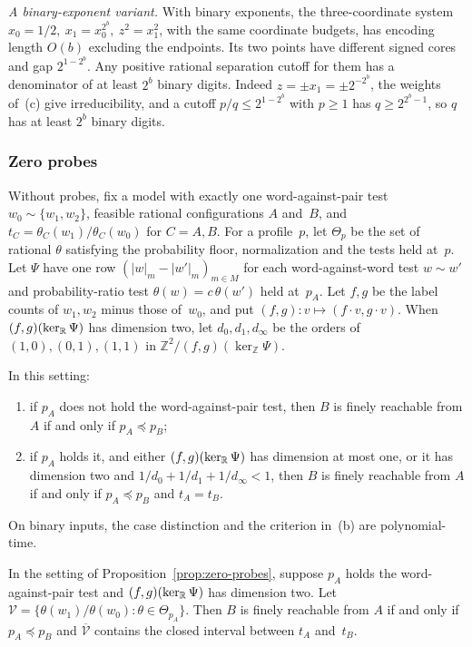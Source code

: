 \emph{A binary-exponent variant.}
With binary exponents, the three-coordinate system $x_0=1/2,\
x_1=x_0^{2^b},\ z^2=x_1^2$, with the same coordinate budgets, has encoding
length $O(b)$ excluding the endpoints. Its two points have different
signed cores and gap $2^{1-2^b}$. Any positive rational separation cutoff
for them has a denominator of at least $2^b$ binary digits. Indeed
$z=\pm x_1=\pm2^{-2^b}$, the weights of~(c) give irreducibility, and a
cutoff $p/q\le2^{1-2^b}$ with $p\ge1$ has $q\ge2^{2^b-1}$, so $q$ has at least $2^b$ binary digits.

\subsubsection{Zero probes}\label{app:zero-probes}

Without probes, fix a model with exactly one word-against-pair test
$w_0\sim\{w_1,w_2\}$, feasible rational configurations $A$ and~$B$, and
$t_C=\theta_C(w_1)/\theta_C(w_0)$ for $C=A,B$. For a profile~$p$, let
$\Theta_p$ be the set of rational $\theta$ satisfying the probability
floor, normalization and the tests held at~$p$. Let $\Psi$ have one row
$(|w|_m-|w'|_m)_{m\in M}$ for each word-against-word test $w\sim w'$ and
probability-ratio test $\theta(w)=c\,\theta(w')$ held at~$p_A$. Let $f,g$
be the label counts of $w_1,w_2$ minus those of~$w_0$, and put
$(f,g)\colon v\mapsto(f\cdot v,g\cdot v)$. When $(f,g)(\ker_{\mathbb{R}}\Psi)$ has
dimension two, let $d_0,d_1,d_\infty$ be the orders of $(1,0),(0,1),(1,1)$
in $\mathbb Z^2/(f,g)(\ker_{\mathbb Z}\Psi)$.

\begin{proposition}\label{prop:zero-probes}
In this setting:
\begin{enumerate}
\item[(a)] if $p_A$ does not hold the word-against-pair test, then $B$ is
finely reachable from $A$ if and only if $p_A\preceq p_B$;
\item[(b)] if $p_A$ holds it, and either $(f,g)(\ker_{\mathbb{R}}\Psi)$ has
dimension at most one, or it has dimension two and
$1/d_0+1/d_1+1/d_\infty<1$, then $B$ is finely reachable from $A$ if and
only if $p_A\preceq p_B$ and $t_A=t_B$.
\end{enumerate}
On binary inputs, the case distinction and the criterion in~(b) are
polynomial-time.
\end{proposition}

\begin{proposition}\label{prop:zero-probe-closure}
In the setting of Proposition~\ref{prop:zero-probes}, suppose $p_A$ holds
the word-against-pair test and $(f,g)(\ker_{\mathbb{R}}\Psi)$ has dimension two.
Let $\mathcal V=\{\theta(w_1)/\theta(w_0):\theta\in\Theta_{p_A}\}$. Then
$B$ is finely reachable from $A$ if and only if $p_A\preceq p_B$ and
$\overline{\mathcal V}$ contains the closed interval between $t_A$
and~$t_B$.
\end{proposition}

